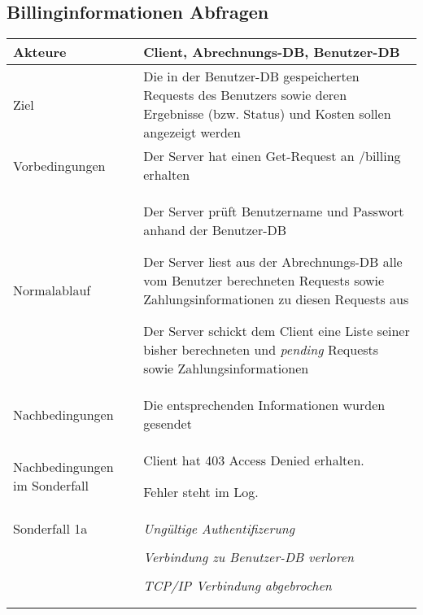 \documentclass[a4paper,10pt,titlepage]{article}
\makeatletter
\newcommand\novspace{\@minipagetrue}
\newenvironment{owncompactitem}{%
\compactitem
}{%
\@finalstrut\@arstrutbox
\@nameuse{endcompactitem}%
\aftergroup\let\aftergroup\@finalstrut\aftergroup\@gobble
}
\newenvironment{owncompactenum}{%
\compactenum
}{%
\@finalstrut\@arstrutbox
\@nameuse{endcompactenum}%
\aftergroup\let\aftergroup\@finalstrut\aftergroup\@gobble
}
\newcommand{\usecase}[7]
{\subsection{#1}
\setlength{\extrarowheight}{2pt}
\begin{tabular}{|p{0.2\textwidth}|p{0.9\textwidth}|}
\hline
  Akteure & #2\\\hline
  Ziel & #3\\\hline
  Vorbedingungen & \novspace
  	\begin{owncompactitem}[-] #4 \end{owncompactitem} \\\hline
  Normalablauf & \vspace{-7pt}
  	\begin{owncompactenum}[1.] #6 \end{owncompactenum} \\\hline
  Nachbedingungen & \novspace
  	\begin{owncompactitem}[-] #5 \end{owncompactitem} \\\hline
  #7
\end{tabular}
}
\newcommand{\sonderfall}[4][\empty]
{
Sonderfall #2 & \vspace{-10pt}
	\textit{#3}
	\begin{owncompactenum}[{#2}.1] {#4} \end{owncompactenum}
  	\ifthenelse{\equal{#1}{\empty}}
    	{\\\hline} %
    	{\ensuremath{\rightarrow} #1 \\ [+1pt] \hline} %

}
\newcommand{\sondernachbedingung}[1]
{
Nachbedingungen im Sonderfall& \novspace
	\begin{owncompactitem}[-]
		#1
	\end{owncompactitem} \\\hline
}
\makeatother
\begin{document}
\usecase{Billinginformationen Abfragen}{Client, Abrechnungs-DB, Benutzer-DB}%
{Die in der Benutzer-DB gespeicherten Requests des Benutzers sowie deren Ergebnisse (bzw. Status) und Kosten sollen angezeigt werden}%
{%
  \item Der Server hat einen Get-Request an /billing erhalten
}
{%
  \item Die entsprechenden Informationen wurden gesendet
}
{%
  \item Der Server prüft Benutzername und Passwort anhand der Benutzer-DB
  \item Der Server liest aus der Abrechnungs-DB alle vom Benutzer berechneten Requests sowie Zahlungsinformationen zu diesen Requests aus
  \item Der Server schickt dem Client eine Liste seiner bisher berechneten und \textit{pending} Requests sowie Zahlungsinformationen
}
{%
  \sondernachbedingung{
	\item Client hat 403 Access Denied erhalten.
	\item Fehler steht im Log.
	}
		\sonderfall[Weiter mit normalem Betrieb]{1a}
    {Ungültige Authentifizerung}
    {
    \item Fehler wird ins Log geschrieben
  	\item Der Client erhält eine entsprechende Fehlermeldung mit HTTP-Status 403 Access Denied
    }
	\sonderfall[Kritischer Fehler, Server ist beendet]{*}%
	{Verbindung zu Benutzer-DB verloren}%
  	{
	\item Der Fehler wird ins Log geschrieben (als schwerwiegender Fehler)
	\item Der Client erhält eine entsprechende Fehlermeldung
	\item Der Server wird beendet
  	}

\sonderfall[Weiter mit normalem Betrieb]{**}%
	{TCP/IP Verbindung abgebrochen}%
	{
	\item Fehlermeldung wird ins Log geschrieben
	}
}

\end{document}
